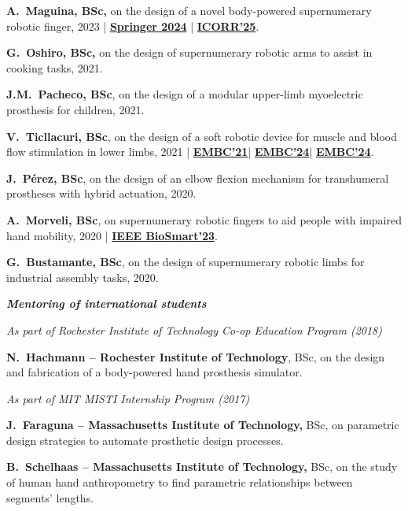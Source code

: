 \documentclass[a4paper,10pt]{article}
\begin{document}
\textbf{A.\ Maguina, BSc,} on the design of a novel body-powered supernumerary robotic finger,
2023 |
\href{https://link.springer.com/chapter/10.1007/978-3-031-49407-9_52}{\textbf{Springer 2024}} |
\href{https://ieeexplore.ieee.org/document/11063063}{\textbf{ICORR'25}}.

\textbf{G.\ Oshiro, BSc,} on the design of supernumerary robotic arms to assist in cooking
tasks, 2021.

\textbf{J.M.\ Pacheco, BSc}, on the design of a modular upper-limb myoelectric prosthesis for
children, 2021.

\textbf{V.\ Ticllacuri, BSc}, on the design of a soft robotic device for muscle and blood flow
stimulation in lower limbs, 2021 |
\href{https://ieeexplore.ieee.org/document/9630974}{\textbf{EMBC'21}}|%
\href{https://ieeexplore.ieee.org/document/10782886}{\textbf{EMBC'24}}|%
\href{https://ieeexplore.ieee.org/document/10782663}{\textbf{EMBC'24}}.

\textbf{J.\ P\'erez, BSc}, on the design of an elbow flexion mechanism for transhumeral
prostheses with hybrid actuation, 2020.

\textbf{A.\ Morveli, BSc}, on supernumerary robotic fingers to aid people with impaired hand
mobility, 2020 |
\href{https://ieeexplore.ieee.org/abstract/document/10162114}{\textbf{IEEE BioSmart'23}}.

\textbf{G.\ Bustamante, BSc}, on the design of supernumerary robotic limbs for industrial
assembly tasks, 2020.

\vspace{4pt}
\textbf{\textit{Mentoring of international students}}

\vspace{2pt}
\textit{As part of Rochester Institute of Technology Co-op Education Program (2018)}

\textbf{N.\ Hachmann -- Rochester Institute of Technology}, BSc, on the design and fabrication
of a body-powered hand prosthesis simulator.

\vspace{2pt}
\textit{As part of MIT MISTI Internship Program (2017)}

\textbf{J.\ Faraguna -- Massachusetts Institute of Technology,} BSc, on parametric design
strategies to automate prosthetic design processes.

\textbf{B.\ Schelhaas -- Massachusetts Institute of Technology,} BSc, on the study of human hand
anthropometry to find parametric relationships between segments' lengths.
\end{document}
